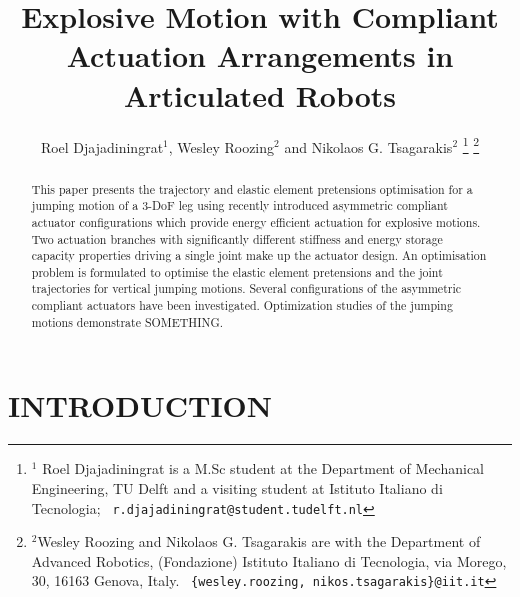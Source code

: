 \documentclass[letterpaper, 10 pt, conference]{ieeeconf}  %
\title{\LARGE \bf
Explosive Motion with Compliant Actuation Arrangements in Articulated Robots
}
\author{Roel Djajadiningrat$^{1}$, Wesley Roozing$^{2}$ and Nikolaos G. Tsagarakis$^{2}$%
\thanks{$^{1}$ Roel Djajadiningrat is a M.Sc student at the Department of Mechanical Engineering, TU Delft and a visiting student at Istituto Italiano di Tecnologia;
        {\tt\ r.djajadiningrat@student.tudelft.nl}
  }%
\thanks{$^{2}$Wesley Roozing and Nikolaos G. Tsagarakis are with the Department of Advanced Robotics,
	(Fondazione) Istituto Italiano di Tecnologia, via Morego,
	30, 16163 Genova, Italy.
        {\tt\ \{wesley.roozing, nikos.tsagarakis\}@iit.it}
     }%
}
\begin{document}
\maketitle
\thispagestyle{empty}
\pagestyle{empty}


\begin{abstract}

This paper presents the trajectory and elastic element pretensions optimisation for a jumping motion of a 3-DoF leg using recently introduced asymmetric compliant actuator configurations which provide energy efficient actuation for explosive motions. Two actuation branches
with significantly different stiffness and energy storage capacity properties driving a single joint make up the actuator design. An optimisation problem is formulated to optimise the elastic element pretensions and the joint trajectories for vertical jumping motions. Several configurations of the asymmetric compliant actuators have been investigated. Optimization studies of the jumping motions demonstrate SOMETHING. 

\end{abstract}


\section{INTRODUCTION}
\end{document}
